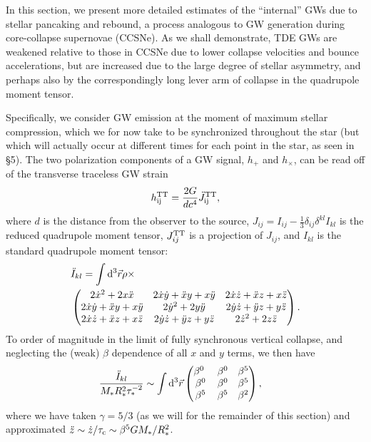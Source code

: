 \documentclass[useAMS, twocolumn, usenatbib]{mn2e}
\begin{document}
In this section, we present more detailed estimates of the ``internal'' GWs due to stellar pancaking and rebound, a process analogous to GW generation during core-collapse supernovae (CCSNe).  As we shall demonstrate, TDE GWs are weakened relative to those in CCSNe due to lower collapse velocities and bounce accelerations, but are increased due to the large degree of stellar asymmetry, and perhaps also by the correspondingly long lever arm of collapse in the quadrupole moment tensor.

Specifically, we consider GW emission at the moment of maximum stellar compression, which we for now take to be synchronized throughout the star (but which will actually occur at different times for each point in the star, as seen in \S 5).  The two polarization components of a GW signal, $h_+$ and $h_{\times}$, can be read off of the transverse traceless GW strain
\begin{equation}
{h}_{\rm ij}^{\rm TT}=\frac{2G}{dc^4}\ddot{J}_{\rm ij}^{\rm TT},
\end{equation}
where $d$ is the distance from the observer to the source, $J_{ij}=I_{ij}-\frac{1}{3}\delta_{ij}\delta^{kl}I_{kl}$ is the reduced quadrupole moment tensor, $J_{ij}^{\rm TT}$ is a projection of $J_{ij}$, and $I_{kl}$ is the standard quadrupole moment tensor:
\begin{align}
&\ddot{I}_{kl}=\int {\rm d}^3\vec{r}\rho \label{quadMoment}\times  \\
&\begin{pmatrix}
  2\dot{x}^2+2x\ddot{x} & 2\dot{x}\dot{y}+\ddot{x}y+x\ddot{y} & 2\dot{x}\dot{z}+\ddot{x}z+x\ddot{z} \\
  2\dot{x}\dot{y}+\ddot{x}y+x\ddot{y} & 2\dot{y}^2+2y\ddot{y} & 2\dot{y}\dot{z}+\ddot{y}z+y\ddot{z} \\
  2\dot{x}\dot{z}+\ddot{x}z+x\ddot{z} & 2\dot{y}\dot{z}+\ddot{y}z+y\ddot{z} & 2\dot{z}^2+2z\ddot{z} \notag
 \end{pmatrix}. 
\end{align}
 To order of magnitude in the limit of fully synchronous vertical collapse, and neglecting the (weak) $\beta$ dependence of all $x$ and $y$ terms, we then have
\begin{align}
&\frac{\ddot{I}_{kl}}{M_*R_*^2\tau_*^{-2}}\sim \int {\rm d}^3\vec{r} 
\begin{pmatrix}
  \beta^0\ & \beta^0 & \beta^5 \\
  \beta^0 & \beta^0 & \beta^5 \\
  \beta^5 & \beta^5 & \beta^2
 \end{pmatrix}, \notag
\end{align}
where we have taken $\gamma=5/3$ (as we will for the remainder of this section) and approximated $\ddot{z}\sim\dot{z}/\tau_{\rm c}\sim \beta^5GM_*/R_*^2$.
\end{document}
